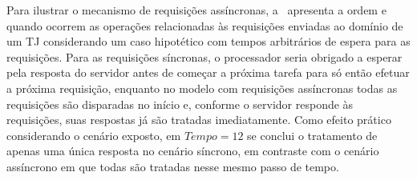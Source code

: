 Para ilustrar o mecanismo de requisições assíncronas,
a~ apresenta a ordem e quando ocorrem
as operações relacionadas às requisições enviadas ao domínio de um TJ
considerando um caso hipotético com tempos arbitrários de espera para as
requisições. Para as requisições síncronas, o processador seria obrigado a
esperar pela resposta do servidor antes de começar a próxima tarefa para só
então efetuar a próxima requisição, enquanto no modelo com requisições
assíncronas todas as requisições são disparadas no início e, conforme o
servidor responde às requisições, suas respostas já são tratadas imediatamente.
Como efeito prático considerando o cenário exposto, em $Tempo = 12$ se conclui
o tratamento de apenas uma única resposta no cenário síncrono, em contraste com
o cenário assíncrono em que todas são tratadas nesse mesmo passo de tempo.

